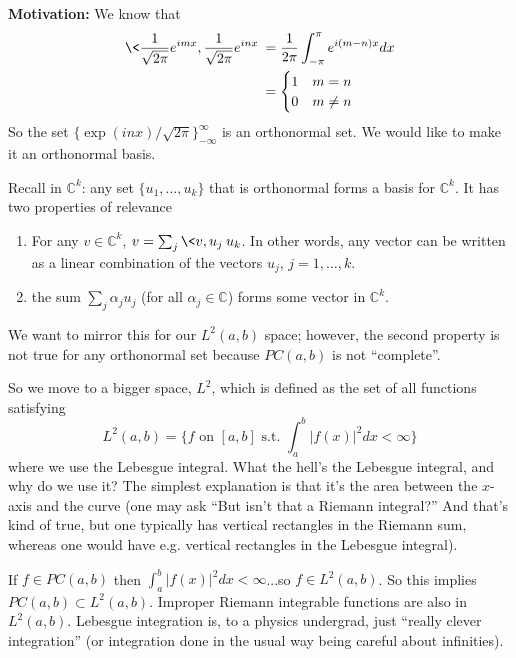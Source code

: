 \textbf{Motivation:} We know that
\begin{align*}
\<\frac{1}{\sqrt{2\pi}}e^{imx},\frac{1}{\sqrt{2\pi}}e^{inx}\>
&= \frac{1}{2\pi}\int^{\pi}_{-\pi}e^{i(m-n)x}dx\\
&= \begin{cases}1&m=n\\
0&m\neq n\end{cases}
\end{align*}
So the set $\{\exp(inx)/\sqrt{2\pi}\}^{\infty}_{-\infty}$ is
an orthonormal set. We would like to make it an orthonormal
basis.

Recall in $\mathbb{C}^k$: any set $\{u_1,\ldots,u_k\}$ that
is orthonormal forms a basis for $\mathbb{C}^k$. It has two
properties of relevance
\begin{enumerate}
\item For any $v\in\mathbb{C}^k$, $v=\sum_j
  \<v,u_j\>u_k$. In other words, any vector can be written
  as a linear combination of the vectors $u_j$, $j=1,\ldots,k$.
\item the sum $\sum_{j}\alpha_{j}u_{j}$ (for all
  $\alpha_j\in\mathbb{C}$) forms some vector in $\mathbb{C}^k$.
\end{enumerate}

We want to mirror this for our $L^{2}(a,b)$ space; however,
the second property is not true for any orthonormal set
because $PC(a,b)$ is not ``complete''. 

So we move to a bigger space, $L^{2}$, which is
defined as the set of all functions satisfying
\begin{equation}
L^{2}(a,b) = \{ \text{$f$ on $[a,b]$ s.t. }
\int^{b}_{a}|f(x)|^{2}dx<\infty \}
\end{equation}
where we use the Lebesgue integral. What the hell's the
Lebesgue integral, and why do we use it? The simplest
explanation is that it's the area between the $x$-axis and
the curve (one may ask ``But isn't that a Riemann
integral?'' And that's kind of true, but one typically has
vertical rectangles in the Riemann sum, whereas one would
have e.g. vertical rectangles in the Lebesgue integral).

If $f\in PC(a,b)$ then
$\int^{b}_{a}|f(x)|^{2}dx<\infty$...so $f\in L^{2}(a,b)$. So
this implies $PC(a,b)\subset L^{2}(a,b)$. Improper Riemann
integrable functions are also in $L^{2}(a,b)$. Lebesgue
integration is, to a physics undergrad, just ``really clever
integration'' (or integration done in the usual way being
careful about infinities).

